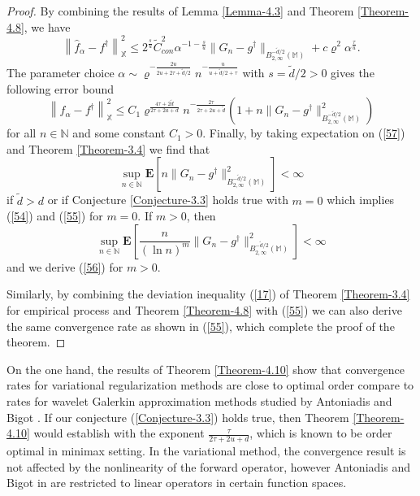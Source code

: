 \documentclass[10pt]{iopart}
\begin{document}
\begin{proof} 
By combining the results of Lemma \ref{Lemma-4.3} and Theorem \ref{Theorem-4.8}, we have
\begin{equation*}
\left\|\widehat{f}_{\alpha}-f^{\dagger}\right\|_{\mathbb{X}}^{2}\leq 2^{\frac{s}{u}}\widetilde{C}_{con}^{2}\alpha^{-1-\frac{s}{u}}
\|G_{n}-g^{\dagger}\|_{B_{2, \infty}^{-\tilde{d}/2}(\mathbb{M})}+c\varrho^{2}\alpha^{\frac{\tau}{u}}.
\end{equation*}
The parameter choice $\alpha \sim \varrho^{-\frac{2u}{2u+2\tau+\tilde{d}/2}}n^{-\frac{u}{u+\tilde{d}/2+\tau}}$ with 
$s=\tilde{d}/2>0$ gives the following error bound
\begin{equation}\label{57}
\left\|\widehat{f}_{\alpha}-f^{\dagger}\right\|_{\mathbb{X}}^{2}\leq 
C_{1}\varrho^{\frac{4\tau+2\tilde{d}}{2\tau+2a+d}}n^{-\frac{2\tau}{2\tau+2u+\tilde{d}}}\left(1+n\|G_{n}-g^{\dagger}\|_{B_{2, \infty}^{-\tilde{d}/2}
(\mathbb{M})}^{2}\right)
\end{equation}
for all $n\in\mathbb{N}$ and some constant $C_{1}>0$. Finally, by taking expectation on (\ref{57}) and Theorem \ref{Theorem-3.4} we find that 
\begin{equation*}
\sup_{n\in\mathbb{N}}\mathbf{E}\left[n\|G_{n}-g^{\dagger}\|_{B_{2, \infty}^{-\tilde{d}/2}(\mathbb{M})}^{2}\right]<\infty
\end{equation*}
if $\tilde{d}>d$ or if Conjecture \ref{Conjecture-3.3} holds true with $m=0$ which implies (\ref{54}) and (\ref{55}) for $m=0$.
If $m>0$, then 
\begin{equation*}
\sup_{n\in\mathbb{N}}\mathbf{E}\left[\frac{n}{(\ln n)^{m}}\|G_{n}-g^{\dagger}\|_{B_{2, \infty}^{-\tilde{d}/2}(\mathbb{M})}^{2}\right]<\infty
\end{equation*}
and we derive (\ref{56}) for $m>0$.

Similarly, by combining the deviation inequality (\ref{17}) of Theorem \ref{Theorem-3.4} for empirical process and Theorem \ref{Theorem-4.8}
with (\ref{55}) we can also derive the same convergence rate as shown in (\ref{55}), which complete the proof of the theorem.
\end{proof}

On the one hand, the results of Theorem \ref{Theorem-4.10} show that convergence rates for variational regularization methods are close to optimal
order compare to rates for wavelet Galerkin approximation methods studied by Antoniadis and Bigot \cite{antoniadis2006}. If our 
conjecture (\ref{Conjecture-3.3}) holds true, then Theorem \ref{Theorem-4.10} would establish with the exponent 
$\frac{\tau}{2\tau+2u+d}$, which is known to be order optimal in minimax setting. In the variational method, the convergence result is not affected by the nonlinearity of the forward 
operator, however Antoniadis and Bigot in \cite{antoniadis2006} are restricted to linear operators in certain function spaces. 
\end{document}
